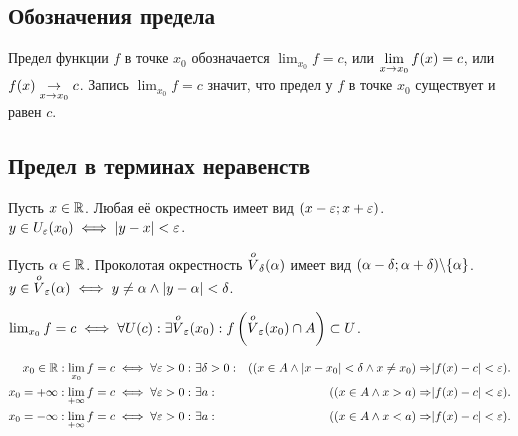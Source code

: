 \documentclass[a4paper]{report}
\begin{document}
    \subsection{Обозначения предела}
    Предел функции $f$ в точке $x_0$ обозначается $\lim_{x_0}f = c$, или $\lim\limits_{x \map x_0}f(x) = c$, или $f(x) \underset{x \map x_0}{\map} c$.
    Запись $\lim_{x_0}f = c$ значит, что предел у $f$ в точке $x_0$ существует и равен $c$.


    \subsection{Предел в терминах неравенств}
    Пусть $x \in \R$.
    Любая её окрестность имеет вид $(x - \eps; x + \eps)$. \newline $y \in U_\eps(x_0) \iff |y - x| < \eps$.

    Пусть $\alpha \in \R$.
    Проколотая окрестность $\neighborhood[\delta]{\alpha}$ имеет вид $(\alpha - \delta; \alpha + \delta) \bs \{\alpha\}$. \newline $y \in \neighborhood{\alpha} \iff y \ne \alpha \land |y - \alpha| < \delta$.

    $\lim_{x_0}f = c \iff \forall U(c) : \exists \neighborhood{x_0}: f\left(\neighborhood{x_0} \cap A\right) \subset U$.

    $\begin{aligned}
         x_0 \in \R: \lim_{x_0}f = c \iff \forall \eps > 0:~ &\exists \delta > 0 : &((x \in A \land |x - x_0| < \delta \land x \ne x_0) \then & |f(x) - c| < \eps).\\
         x_0 = +\infty: \lim_{+\infty}f = c \iff \forall \eps > 0:~ &\exists a : &((x \in A \land x > a)\then &|f(x) - c| < \eps).\\
         x_0 = -\infty: \lim_{+\infty}f = c \iff \forall \eps > 0:~ &\exists a :& ((x \in A \land x < a)\then &|f(x) - c| < \eps).
    \end{aligned}$
\end{document}
